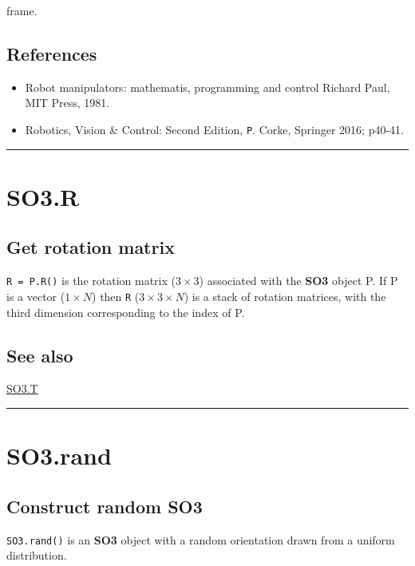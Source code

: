 frame.


\subsection*{References}
\begin{itemize}
  \item Robot manipulators: mathematis, programming and control     Richard Paul, MIT Press, 1981.
  \item Robotics, Vision \& Control: Second Edition, \texttt{P}. Corke, Springer 2016; p40-41.
\end{itemize}
\vspace{1.5ex}\hrule

\hypertarget{SO3.R}{\section*{SO3.R}}
\subsection*{Get rotation matrix}


\texttt{R = P.R()} is the rotation matrix ($3 \times 3$) associated with the \textbf{\color{red} SO3} object P.  If P
is a vector ($1 \times N$) then \texttt{R} ($3 \times 3 \times N$) is a stack of rotation matrices, with
the third dimension corresponding to the index of P.


\subsection*{See also}


\hyperlink{SO3.T}{\color{blue} SO3.T}

\vspace{1.5ex}\hrule

\hypertarget{SO3.rand}{\section*{SO3.rand}}
\subsection*{Construct random SO3}


\texttt{SO3.rand()} is an \textbf{\color{red} SO3} object with a random orientation drawn from
a uniform distribution.



